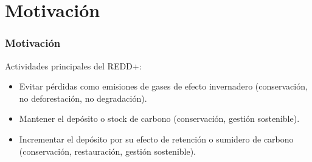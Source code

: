 \documentclass[xcolor=table]{beamer}
\begin{document}
	\section{Motivaci\'on}
	\begin{frame}
		\frametitle{Motivaci\'on}		
		Actividades principales del REDD+:
		\begin{itemize}
			\item Evitar p\'erdidas como emisiones de gases de efecto invernadero (conservaci\'on, no deforestaci\'on, no degradaci\'on).
			\item Mantener el dep\'osito o stock de carbono (conservaci\'on, gesti\'on sostenible).
			\item Incrementar el dep\'osito por su efecto de retenci\'on o sumidero de carbono (conservaci\'on, restauraci\'on, gesti\'on sostenible).
		\end{itemize}
		
	\end{frame}
	
\end{document}
